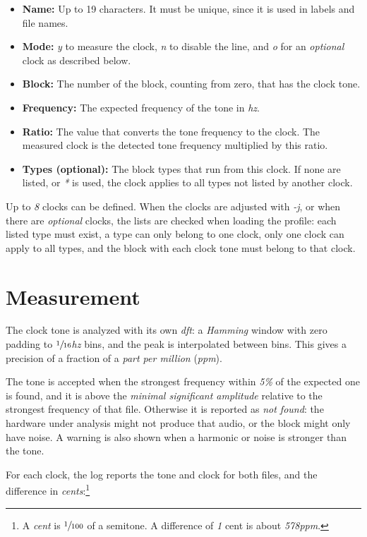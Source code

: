\documentclass[10pt,a4paper]{report}
\newcommand{\ac}[1]{\textit{\mbox{\acrshort{#1}}}}
\newcommand{\hz}[1]{\textit{\mbox{#1\acrshort{hz}}}}
\begin{document}
\begin{appendices}
\begin{itemize}
	\item \textbf{Name:} Up to 19 characters. It must be unique, since it is used in labels and file names.
	\item \textbf{Mode:} \textit{y} to measure the clock, \textit{n} to disable the line, and \textit{o} for an \textit{optional} clock as described below.
	\item \textbf{Block:} The number of the block, counting from zero, that has the clock tone.
	\item \textbf{Frequency:} The expected frequency of the tone in \ac{hz}.
	\item \textbf{Ratio:} The value that converts the tone frequency to the clock. The measured clock is the detected tone frequency multiplied by this ratio.
	\item \textbf{Types (optional):} The block types that run from this clock. If none are listed, or \textit{*} is used, the clock applies to all types not listed by another clock.
\end{itemize}

Up to \textit{8} clocks can be defined. When the clocks are adjusted with \textit{-j}, or when there are \textit{optional} clocks, the lists are checked when loading the profile: each listed type must exist, a type can only belong to one clock, only one clock can apply to all types, and the block with each clock tone must belong to that clock.

\section{Measurement}

The clock tone is analyzed with its own \ac{dft}: a \textit{Hamming} window with zero padding to \hz{$\sfrac{1}{16}$} bins, and the peak is interpolated between bins. This gives a precision of a fraction of a \textit{part per million} (\textit{ppm}).

The tone is accepted when the strongest frequency within \textit{5\%} of the expected one is found, and it is above the \textit{minimal significant amplitude} relative to the strongest frequency of that file. Otherwise it is reported as \textit{not found}: the hardware under analysis might not produce that audio, or the block might only have noise. A warning is also shown when a harmonic or noise is stronger than the tone.

For each clock, the log reports the tone and clock for both files, and the difference in \textit{cents}:\footnote{A \textit{cent} is $\sfrac{1}{100}$ of a semitone. A difference of \textit{1} cent is about \textit{578ppm}.}


\end{appendices}
\end{document}
